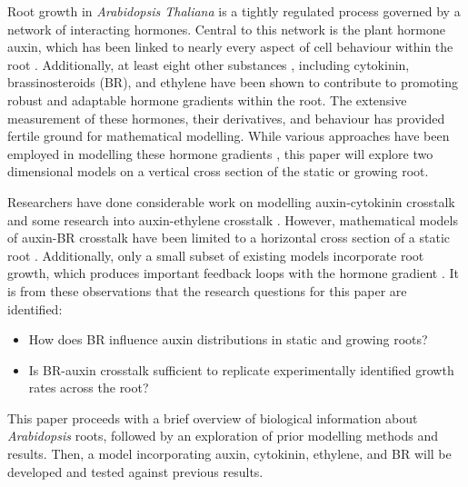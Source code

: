 Root growth in \emph{Arabidopsis Thaliana} is a tightly regulated process governed by a network of interacting hormones. Central to this network is the plant hormone auxin, which has been linked to nearly every aspect of cell behaviour within the root \cite{saini2013}. Additionally, at least eight other substances \cite{tian2018}, including cytokinin, brassinosteroids (BR), and ethylene have been shown to contribute to promoting robust and adaptable hormone gradients within the root. The extensive measurement of these hormones, their derivatives, and behaviour \cite{verbelen2006, kramer2007, marhavy2011, ambrose2013} has provided fertile ground for mathematical modelling. While various approaches have been employed in modelling these hormone gradients \cite{rutten2022}, this paper will explore two dimensional models on a vertical cross section of the static or growing root.

\medskip

Researchers have done considerable work on modelling auxin-cytokinin crosstalk \cite{muraro2013, mahonen2014, band2014, dimambro2017, salvi2020, mellor2020} and some research into auxin-ethylene crosstalk \cite{moore2015}. However, mathematical models of auxin-BR crosstalk have been limited to a horizontal cross section of a static root \cite{ibanes2009}. Additionally, only a small subset of existing models incorporate root growth, which produces important feedback loops with the hormone gradient \cite{rutten2022}. It is from these observations that the research questions for this paper are identified:
\begin{itemize}
	\item How does BR influence auxin distributions in static and growing roots? 
	\item Is BR-auxin crosstalk sufficient to replicate experimentally identified growth rates across the root?
\end{itemize}


This paper proceeds with a brief overview of biological information about \emph{Arabidopsis} roots, followed by an exploration of prior modelling methods and results. Then, a model incorporating auxin, cytokinin, ethylene, and BR will be developed and tested against previous results.
